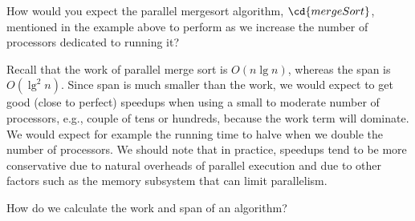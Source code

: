 \begin{grp}
\begin{exercise}
How would you expect the parallel mergesort algorithm, $\cd{mergeSort}$,
mentioned in the example above to perform as we increase the number of
processors dedicated to running it?
\end{exercise}

\begin{solution}
Recall that the work of parallel merge sort is $O(n\lg{n})$, whereas
the span is $O(\lg^2{n})$.  
%
Since span is much smaller than the work, we would expect to get good
(close to perfect) speedups when using a small to moderate number of
processors, e.g., couple of tens or hundreds, because the work term
will dominate.
%
We would expect for example the running time to halve when we double
the number of processors.
%
We should note that in practice, speedups tend to be more conservative
due to natural overheads of parallel execution and due to other
factors such as the memory subsystem that can limit parallelism. 
\end{solution}
\end{grp}


\begin{teachask}
How do we calculate the work and span of an algorithm?
\end{teachask}

